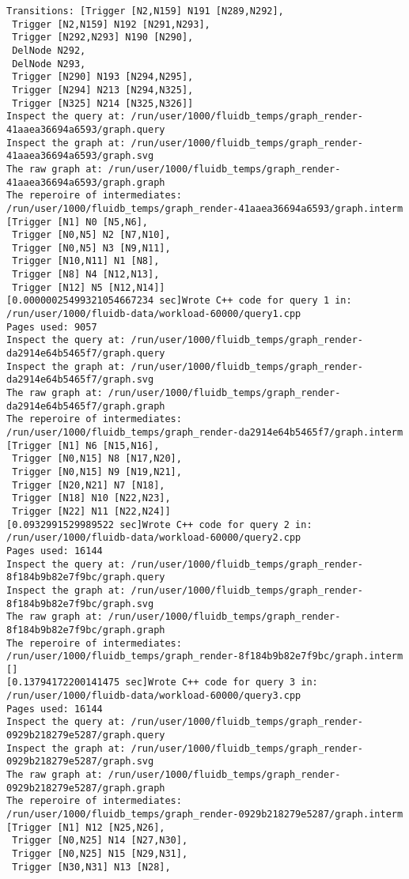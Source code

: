 \begin{code}
\begin{verbatim}
Transitions: [Trigger [N2,N159] N191 [N289,N292],
 Trigger [N2,N159] N192 [N291,N293],
 Trigger [N292,N293] N190 [N290],
 DelNode N292,
 DelNode N293,
 Trigger [N290] N193 [N294,N295],
 Trigger [N294] N213 [N294,N325],
 Trigger [N325] N214 [N325,N326]]
Inspect the query at: /run/user/1000/fluidb_temps/graph_render-41aaea36694a6593/graph.query
Inspect the graph at: /run/user/1000/fluidb_temps/graph_render-41aaea36694a6593/graph.svg
The raw graph at: /run/user/1000/fluidb_temps/graph_render-41aaea36694a6593/graph.graph
The reperoire of intermediates: /run/user/1000/fluidb_temps/graph_render-41aaea36694a6593/graph.interm
[Trigger [N1] N0 [N5,N6],
 Trigger [N0,N5] N2 [N7,N10],
 Trigger [N0,N5] N3 [N9,N11],
 Trigger [N10,N11] N1 [N8],
 Trigger [N8] N4 [N12,N13],
 Trigger [N12] N5 [N12,N14]]
[0.00000025499321054667234 sec]Wrote C++ code for query 1 in: /run/user/1000/fluidb-data/workload-60000/query1.cpp
Pages used: 9057
Inspect the query at: /run/user/1000/fluidb_temps/graph_render-da2914e64b5465f7/graph.query
Inspect the graph at: /run/user/1000/fluidb_temps/graph_render-da2914e64b5465f7/graph.svg
The raw graph at: /run/user/1000/fluidb_temps/graph_render-da2914e64b5465f7/graph.graph
The reperoire of intermediates: /run/user/1000/fluidb_temps/graph_render-da2914e64b5465f7/graph.interm
[Trigger [N1] N6 [N15,N16],
 Trigger [N0,N15] N8 [N17,N20],
 Trigger [N0,N15] N9 [N19,N21],
 Trigger [N20,N21] N7 [N18],
 Trigger [N18] N10 [N22,N23],
 Trigger [N22] N11 [N22,N24]]
[0.0932991529989522 sec]Wrote C++ code for query 2 in: /run/user/1000/fluidb-data/workload-60000/query2.cpp
Pages used: 16144
Inspect the query at: /run/user/1000/fluidb_temps/graph_render-8f184b9b82e7f9bc/graph.query
Inspect the graph at: /run/user/1000/fluidb_temps/graph_render-8f184b9b82e7f9bc/graph.svg
The raw graph at: /run/user/1000/fluidb_temps/graph_render-8f184b9b82e7f9bc/graph.graph
The reperoire of intermediates: /run/user/1000/fluidb_temps/graph_render-8f184b9b82e7f9bc/graph.interm
[]
[0.13794172200141475 sec]Wrote C++ code for query 3 in: /run/user/1000/fluidb-data/workload-60000/query3.cpp
Pages used: 16144
Inspect the query at: /run/user/1000/fluidb_temps/graph_render-0929b218279e5287/graph.query
Inspect the graph at: /run/user/1000/fluidb_temps/graph_render-0929b218279e5287/graph.svg
The raw graph at: /run/user/1000/fluidb_temps/graph_render-0929b218279e5287/graph.graph
The reperoire of intermediates: /run/user/1000/fluidb_temps/graph_render-0929b218279e5287/graph.interm
[Trigger [N1] N12 [N25,N26],
 Trigger [N0,N25] N14 [N27,N30],
 Trigger [N0,N25] N15 [N29,N31],
 Trigger [N30,N31] N13 [N28],

\end{verbatim}
\end{code}

